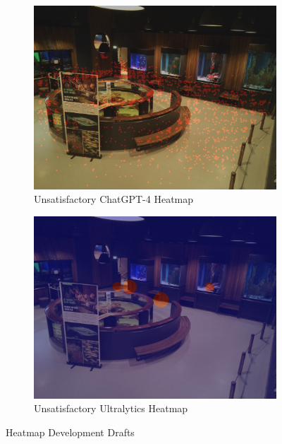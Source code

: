 \begin{figure}[H]
    \centering
    \begin{subfigure}{0.49\textwidth}
        \centering
        \includegraphics[width=\textwidth]{Images/Analytics/heatmap_gpt.jpg}
        \caption{Unsatisfactory ChatGPT-4 Heatmap}
    \end{subfigure}
    \hfill
    \begin{subfigure}{0.49\textwidth}
        \centering
        \includegraphics[width=1\textwidth]{Images/Analytics/heatmap_ultralytics.jpg}
        \caption{Unsatisfactory Ultralytics Heatmap}
    \end{subfigure}
    \caption{Heatmap Development Drafts}
    \label{fig:heatmap_drafts}
\end{figure}

